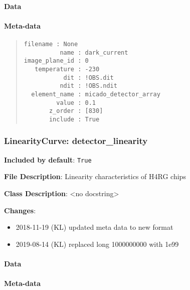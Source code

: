\paragraph{Data%
  \label{id7}%
}


\paragraph{Meta-data%
  \label{id8}%
}

\begin{quote}
\begin{alltt}
\begin{lstlisting}[frame=single]
      filename : None
          name : dark_current
image_plane_id : 0
   temperature : -230
           dit : !OBS.dit
          ndit : !OBS.ndit
  element_name : micado_detector_array
         value : 0.1
       z_order : [830]
       include : True
\end{lstlisting}
\end{alltt}
\end{quote}


\subsubsection{LinearityCurve: \textquotedbl{}detector\_linearity\textquotedbl{}%
  \label{linearitycurve-detector-linearity}%
}

\textbf{Included by default}: \texttt{True}

\textbf{File Description}: Linearity characteristics of H4RG chips

\textbf{Class Description}: <no docstring>

\textbf{Changes}:

\begin{itemize}
\item 2018-11-19 (KL) updated meta data to new format

\item 2019-08-14 (KL) replaced long 1000000000 with 1e99
\end{itemize}


\paragraph{Data%
  \label{id9}%
}


\paragraph{Meta-data%
  \label{id10}%
}

